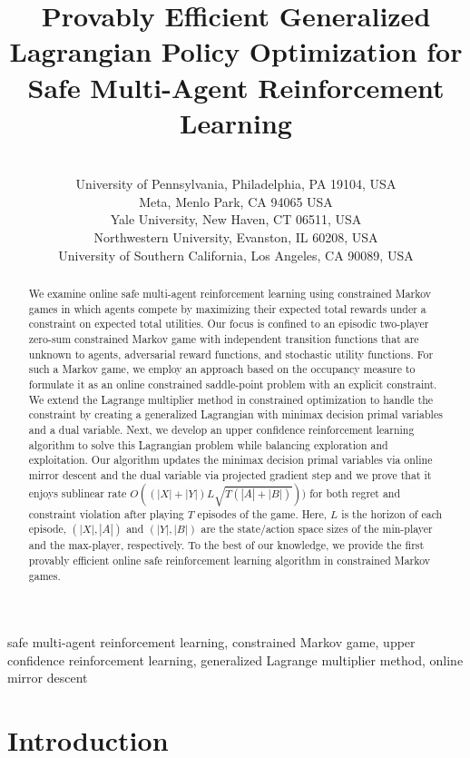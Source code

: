 \documentclass[12pt, final]{l4dc2023}
\title[Provably Efficient Generalized Lagrangian Policy Optimization for Safe MARL]{Provably Efficient Generalized Lagrangian Policy Optimization for Safe Multi-Agent Reinforcement Learning}
\author{%
 \Name{Dongsheng Ding} \Email{dongshed@seas.upenn.edu}\\
 \addr University of Pennsylvania, Philadelphia, PA 19104, USA
 \AND
 \Name{Xiaohan Wei} \Email{ubimeteor@fb.com}\\
 \addr Meta, Menlo Park, CA 94065 USA
 \AND
 \Name{Zhuoran Yang} \Email{zhuoran.yang@yale.edu}\\
 \addr Yale University,
 New Haven, CT 06511, USA
 \AND
 \Name{Zhaoran Wang} \Email{zhaoranwang@gmail.com}\\
 \addr Northwestern University, 
 Evanston, IL 60208, USA
   \AND
 \Name{Mihailo R. Jovanovi\'c} \Email{mihailo@usc.edu}\\
 \addr University of Southern California, Los Angeles, CA 90089, USA
}
\begin{document}
\maketitle

\begin{abstract}%
	 We examine online safe multi-agent reinforcement learning using constrained Markov games in which agents compete by maximizing their expected total rewards under a constraint on expected total utilities. Our focus is confined to an episodic two-player zero-sum constrained Markov game with independent transition functions that are unknown to agents, adversarial reward functions, and stochastic utility functions. For such a Markov game, we employ an approach based on the occupancy measure to formulate it as an online constrained saddle-point problem with an explicit constraint. We extend the Lagrange multiplier method in constrained optimization to handle the constraint by creating a generalized Lagrangian with minimax decision primal variables and a dual variable. Next, we develop an upper confidence reinforcement learning algorithm to solve this Lagrangian problem while balancing exploration and exploitation. Our algorithm updates the minimax decision primal variables via online mirror descent and the dual variable via projected gradient step and we prove that it enjoys sublinear rate $ O((|X|+|Y|) L \sqrt{T(|A|+|B|)}))$ for both regret and constraint violation after playing $T$ episodes of the game. Here, $L$ is the horizon of each episode, $(|X|,|A|)$ and $(|Y|,|B|)$ are the state/action space sizes of the min-player and the max-player, respectively.
	 To the best of our knowledge, we provide the first provably efficient online safe reinforcement learning algorithm in constrained Markov games.

\end{abstract}

\begin{keywords}%
	safe multi-agent reinforcement learning, constrained Markov game, upper confidence reinforcement learning, generalized Lagrange multiplier method, online mirror descent
\end{keywords}

\section{Introduction}
\end{document}
